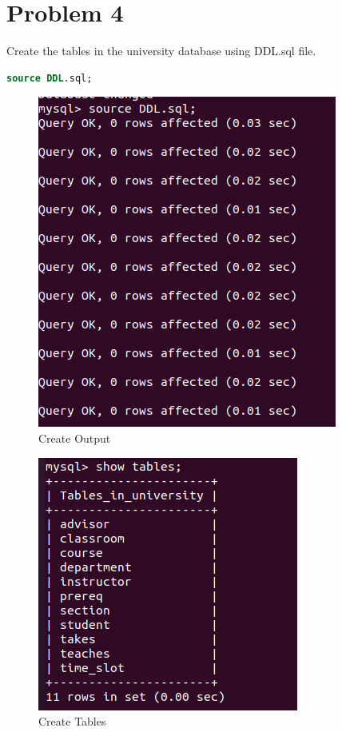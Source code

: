 \documentclass{article}
\begin{document}
\section{Problem 4}
Create the tables in the university database using DDL.sql file.
\begin{lstlisting}[language=sql]
  source DDL.sql;
\end{lstlisting}
\begin{figure}[!ht]
  \begin{center}
  \includegraphics[scale=0.8]{Q4_2.png}
  \caption{Create Output}
  \end{center}
\end{figure}
\begin{figure}[!ht]
  \begin{center}
  \includegraphics[scale=0.8]{Q4.png}
  \caption{Create Tables}
  \end{center}
\end{figure}
\end{document}

